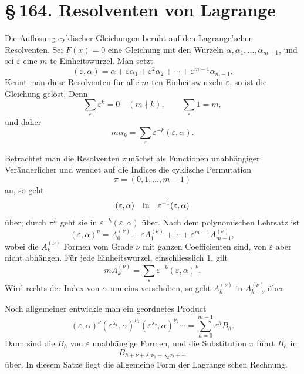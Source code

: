 \documentclass[11pt]{article}
\providecommand{\sect}[2]{\section*{\S\,#1. #2}}
\begin{document}
\sect{164}{Resolventen von Lagrange}

Die Auflösung cyklischer Gleichungen beruht auf den Lagrange'schen Resolventen. Sei $F(x)=0$ eine Gleichung mit den Wurzeln $\alpha,\alpha_1,
\ldots,\alpha_{m-1}$, und sei $\varepsilon$ eine $m$-te Einheitswurzel. Man setzt
\[
        (\varepsilon,\alpha)=
        \alpha+\varepsilon\alpha_1+\varepsilon^2\alpha_2+
        \cdots+\varepsilon^{m-1}\alpha_{m-1}.                          \tag{1}
\]
Kennt man diese Resolventen für alle $m$-ten Einheitswurzeln $\varepsilon$, so ist die Gleichung gelöst. Denn
\[
        \sum_{\varepsilon}\varepsilon^k=0\quad (m\nmid k),\qquad
        \sum_{\varepsilon}1=m,                                          \tag{2}
\]
und daher
\[
        m\alpha_k=\sum_{\varepsilon}\varepsilon^{-k}(\varepsilon,\alpha).\tag{4}
\]

Betrachtet man die Resolventen zunächst als Functionen unabhängiger Veränderlicher und wendet auf die Indices die cyklische Permutation
\[
        \pi=(0,1,
        \ldots,m-1)
\]
an, so geht
\[
        (\varepsilon,\alpha)\quad\hbox{in}\quad
        \varepsilon^{-1}(\varepsilon,\alpha)
\]
über; durch $\pi^h$ geht sie in $\varepsilon^{-h}(\varepsilon,\alpha)$ über. Nach dem polynomischen Lehrsatz ist
\[
        (\varepsilon,\alpha)^\nu
        =A_0^{(\nu)}+
        \varepsilon A_1^{(\nu)}+
        \cdots+
        \varepsilon^{m-1}A_{m-1}^{(\nu)},                               \tag{5}
\]
wobei die $A_k^{(\nu)}$ Formen vom Grade $\nu$ mit ganzen Coefficienten sind, von $\varepsilon$ aber nicht abhängen. Für jede Einheitswurzel, einschliesslich $1$, gilt
\[
        mA_k^{(\nu)}=
        \sum_{\varepsilon}\varepsilon^{-k}(\varepsilon,\alpha)^\nu.       \tag{6}
\]
Wird rechts der Index von $\alpha$ um eins verschoben, so geht $A_k^{(\nu)}$ in $A_{k+\nu}^{(\nu)}$ über.

Noch allgemeiner entwickle man ein geordnetes Product
\[
        (\varepsilon,\alpha)^{\nu}
        (\varepsilon^{\lambda_1},\alpha)^{\nu_1}
        (\varepsilon^{\lambda_2},\alpha)^{\nu_2}
        \cdots
        =\sum_{h=0}^{m-1}\varepsilon^h B_h.                              \tag{7}
\]
Dann sind die $B_h$ von $\varepsilon$ unabhängige Formen, und die Substitution $\pi$ führt $B_h$ in
\[
        B_{h+\nu+\lambda_1\nu_1+\lambda_2\nu_2+\cdots}
\]
über. In diesem Satze liegt die allgemeine Form der Lagrange'schen Rechnung.
\end{document}
